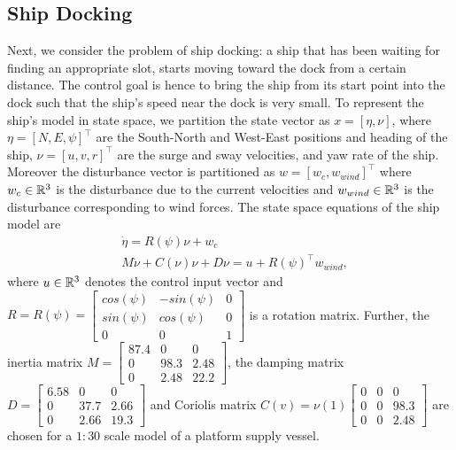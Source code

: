 \subsection{Ship Docking}\label{subsec:6dship}
Next, we consider the problem of ship docking: a ship that has been waiting for finding an appropriate slot, starts moving toward the dock from a certain distance. The control goal is hence to bring the ship from its start point into the dock such that the ship's speed near the dock is very small. To represent the ship's model in state space, we partition the state vector as $x=[\eta,\nu]$, where $\eta=[N,E,\psi]^\top$ are the South-North and West-East positions and heading of the ship, $\nu = [u ,v ,r]^\top$ are the surge and sway velocities, and yaw rate of the ship. Moreover the disturbance vector is partitioned as $w=[w_c,w_{wind}]^\top$ where $w_c\in\mathbb{R}^3$ is the disturbance due to the current velocities and $w_{wind}\in\mathbb{R}^3$ is the disturbance corresponding to wind forces. The state space equations of the ship model are
\begin{align*}
&\dot{\eta}=R(\psi)\nu+w_c \\
&M\dot{\nu}+C(\nu)\nu+D\nu=u+R(\psi)^{\top}w_{wind},
\end{align*}
where $u\in\mathbb{R}^3$ denotes the control input vector and $R=R(\psi)=\begin{bmatrix}
cos(\psi) &-sin(\psi) &0\\
sin(\psi) & cos(\psi) & 0\\
0 & 0 & 1
\end{bmatrix}$ is a rotation matrix. Further, the inertia matrix $M=\begin{bmatrix}
87.4 & 0 & 0 \\
0 & 98.3 & 2.48 \\
0 & 2.48 & 22.2
\end{bmatrix}$, the damping matrix $D=\begin{bmatrix}
6.58 & 0 & 0 \\
0 & 37.7 & 2.66 \\
0 & 2.66 & 19.3
\end{bmatrix}$ and Coriolis matrix $C(v)=\nu(1)\begin{bmatrix}
0 & 0 & 0 \\
0 & 0 & 98.3 \\
0 & 0 & 2.48
\end{bmatrix}$ are chosen for a $1:30$ scale model of a platform supply vessel.

